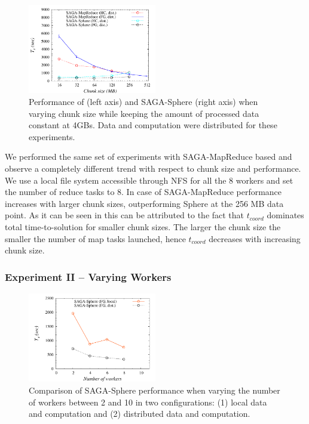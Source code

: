 \documentclass[3p,twocolumn]{elsarticle}
\begin{document}
\begin{figure}[htb!]
 \upp \upp
 \includegraphics[width=0.5\textwidth]{figures/sphere_mr_varying_chunksize.pdf}
 \upp \upp
 \caption{
   Performance of \sagamapreduce (left axis) and
   SAGA-Sphere (right axis) when varying chunk size while keeping the amount
   of processed data constant at 4GBs. Data and computation were
   distributed for these experiments.
   \label{fig:sphere_mr_chunksize}
   }
\end{figure}

We performed the same set of experiments with SAGA-MapReduce based
\wc and observe a completely different trend with respect to
chunk size and performance. We use a local file system accessible
through NFS for all the 8 workers and set the number of reduce tasks
to 8.  In case of SAGA-MapReduce performance increases with larger
chunk sizes, outperforming Sphere at the 256 MB data point. As it can
be seen in  this can be attributed to the fact that
$t_{coord}$ dominates total time-to-solution for smaller chunk sizes.
The larger the chunk size the smaller the number of map tasks
launched, hence $t_{coord}$ decreases with increasing chunk size.


\subsubsection{Experiment II -- Varying Workers}

\begin{figure}[htb!]
 \includegraphics[width=0.5\textwidth]{figures/sphere_varying_workers.pdf}
 \caption{
   Comparison of SAGA-Sphere performance when varying the number of workers
   between 2 and 10 in two configurations: (1) local data and computation
   and (2) distributed data and computation.
   \label{fig:sphere_varying_workers}
   }
\end{figure}
\end{document}
